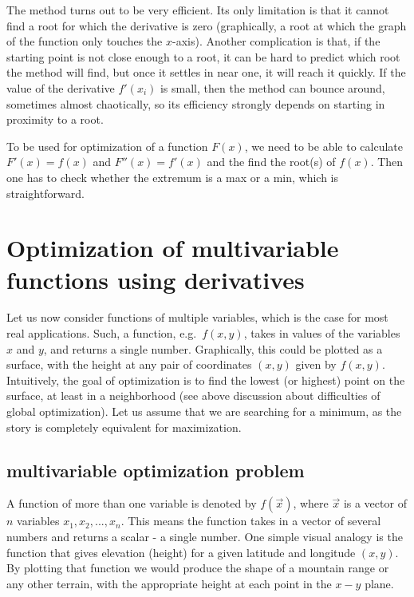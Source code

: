 \documentclass[
  letterpaper,
  DIV=11,
  numbers=noendperiod]{scrreprt}
\begin{document}
The method turns out to be very efficient. Its only limitation is that
it cannot find a root for which the derivative is zero (graphically, a
root at which the graph of the function only touches the \(x\)-axis).
Another complication is that, if the starting point is not close enough
to a root, it can be hard to predict which root the method will find,
but once it settles in near one, it will reach it quickly. If the value
of the derivative \(f'(x_i)\) is small, then the method can bounce
around, sometimes almost chaotically, so its efficiency strongly depends
on starting in proximity to a root.

To be used for optimization of a function \(F(x)\), we need to be able
to calculate \(F'(x) = f(x)\) and \(F''(x) = f'(x)\) and the find the
root(s) of \(f(x)\). Then one has to check whether the extremum is a max
or a min, which is straightforward.

\section{Optimization of multivariable functions using
derivatives}\label{optimization-of-multivariable-functions-using-derivatives}

Let us now consider functions of multiple variables, which is the case
for most real applications. Such, a function, e.g.~\(f(x,y)\), takes in
values of the variables \(x\) and \(y\), and returns a single number.
Graphically, this could be plotted as a surface, with the height at any
pair of coordinates \((x,y)\) given by \(f(x,y)\). Intuitively, the goal
of optimization is to find the lowest (or highest) point on the surface,
at least in a neighborhood (see above discussion about difficulties of
global optimization). Let us assume that we are searching for a minimum,
as the story is completely equivalent for maximization.

\subsection{multivariable optimization
problem}\label{multivariable-optimization-problem}

A function of more than one variable is denoted by \(f(\vec x)\), where
\(\vec x\) is a vector of \(n\) variables \(x_1, x_2, ..., x_n\). This
means the function takes in a vector of several numbers and returns a
scalar - a single number. One simple visual analogy is the function that
gives elevation (height) for a given latitude and longitude \((x,y)\).
By plotting that function we would produce the shape of a mountain range
or any other terrain, with the appropriate height at each point in the
\(x-y\) plane.
\end{document}
